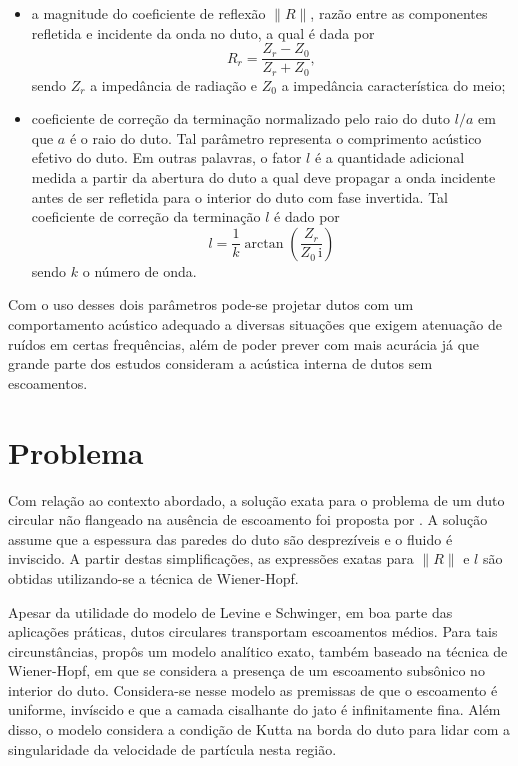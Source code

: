 \begin{itemize}
    \item a magnitude do coeficiente de reflexão $\|R\|$, razão entre as componentes refletida e incidente da onda no duto, a qual é dada por
    \begin{equation}
        R_{r} =\frac{Z_{r} - Z_{0}}{Z_{r} + Z_{0}},
        \label{eq:R}
    \end{equation}
    sendo $Z_{r}$ a impedância de radiação e $Z_{0}$ a impedância característica do meio;
    
    \item coeficiente de correção da terminação normalizado pelo raio do duto $l/a$ em que $a$ é o raio do duto. Tal parâmetro representa o comprimento acústico efetivo do duto. Em outras palavras, o fator $l$ é a quantidade adicional medida a partir da abertura do duto a qual deve propagar a onda incidente antes de ser refletida para o interior do duto com fase invertida. Tal coeficiente de correção da terminação $l$ é dado por
    \begin{equation}
        l = \frac{1}{k} \arctan\!\left(\frac{Z_{r}}{Z_{0} \, \mathrm{i}}\right)
        \label{eq:l}
    \end{equation}
    sendo $k$ o número de onda.
\end{itemize}

Com o uso desses dois parâmetros pode-se projetar dutos com um comportamento acústico adequado a diversas situações que exigem atenuação de ruídos em certas frequências, além de poder prever com mais acurácia já que grande parte dos estudos consideram a acústica interna de dutos sem escoamentos.

\section{Problema}

Com relação ao contexto abordado, a solução exata para o problema de um duto circular não flangeado na ausência de escoamento foi proposta por . A solução assume que a espessura das paredes do duto são desprezíveis e o fluido é inviscido. A partir destas simplificações, as expressões exatas para $\|R\|$ e $l$ são obtidas utilizando-se a técnica de Wiener-Hopf.

Apesar da utilidade do modelo de Levine e Schwinger, em boa parte das aplicações práticas, dutos circulares transportam escoamentos médios. Para tais circunstâncias,  propôs um modelo analítico exato, também baseado na técnica de Wiener-Hopf, em que se considera a presença de um escoamento subsônico no interior do duto. Considera-se nesse modelo as premissas de que o escoamento é uniforme, invíscido e que a camada cisalhante do jato é infinitamente fina. Além disso, o modelo considera a condição de Kutta na borda do duto para lidar com a singularidade da velocidade de partícula nesta região.

